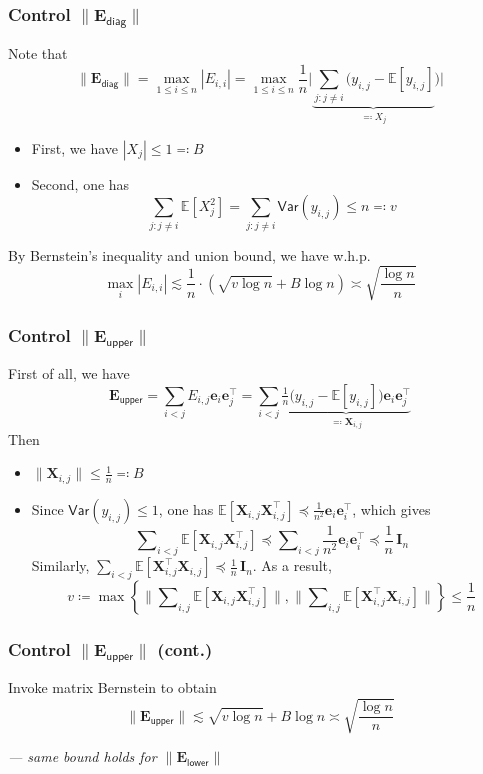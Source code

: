 \documentclass[compress,
mathserif,wide,%
]{beamer}
\begin{document}
\begin{frame}
	\frametitle{Control $\|\bm{E}_{\mathsf{diag}}\|$}
	Note that
	\[
\|\bm{E}_{\mathsf{diag}}\|=\max_{1\leq i\leq n}|E_{i,i}|=\max_{1\leq i\leq n} \frac{1}{n} \Big| \underbrace{\sum_{j:j\neq i}\big( y_{i,j}- \mathbb{E} [ y_{i,j}]}_{\eqqcolon X_{j}} \big) \Big|
\]
\begin{itemize}
	\item First, we have $|X_j| \leq 1 \eqqcolon B$
	\item Second, one has
	\[
	\sum_{j : j \neq i} \mathbb{E} [X_j^2] = \sum_{j : j \neq i} \mathsf{Var} (y_{i,j}) \leq n \eqqcolon v
	\]
\end{itemize}
By Bernstein's inequality and union bound, we have w.h.p.
\[
\max_{i} |E_{i,i}| \lesssim \frac{1}{n} \cdot ( \sqrt{v \log n} + B \log n) \asymp \sqrt{\frac{\log n }{n}}
\]
\end{frame}

\begin{frame}
	\frametitle{Control $\|\bm{E}_{\mathsf{upper}}\|$}
	First of all, we have
	\[
	\bm{E}_{\mathsf{upper}} = \sum_{i < j} E_{i,j} \bm{e}_{i} \bm{e}_{j}^{\top} =\sum_{i < j} \underbrace{ \tfrac{1}{n} \big( y_{i,j}- \mathbb{E} [ y_{i,j}] \big) \bm{e}_{i} \bm{e}_{j}^{\top} }_{\eqqcolon \bm{X}_{i,j}}
	\]
	Then 
	\begin{itemize}
		\item $\|\bm{X}_{i,j}\| \leq \frac{1}{n} \eqqcolon B$
		\item Since $\mathsf{Var}(y_{i,j})\leq 1$, one has
$\mathbb{E}\left[\bm{X}_{i,j}\bm{X}_{i,j}^{\top}\right]\preceq \frac{1}{n^2} \bm{e}_{i}\bm{e}_{i}^{\top}$, which gives
%
\[
\sum\nolimits_{i < j}\mathbb{E}\left[\bm{X}_{i,j}\bm{X}_{i,j}^{\top}\right]\preceq\sum\nolimits_{i<j} \frac{1}{n^2} \bm{e}_{i}\bm{e}_{i}^{\top} \preceq \frac{1}{n}\,\bm{I}_{n}
\]
%
Similarly, $\sum_{i<j}\mathbb{E}\left[ \bm{X}_{i,j}^{\top} \bm{X}_{i,j} \right]\preceq \frac{1}{n}\,\bm{I}_{n}$.
As a result,
%
\[
v \coloneqq \max\left\{ \Big\|\sum\nolimits_{i,j}\mathbb{E}\left[\bm{X}_{i,j}\bm{X}_{i,j}^{\top}\right]\Big\|,\Big\|\sum\nolimits_{i,j}\mathbb{E}\left[\bm{X}_{i,j}^{\top}\bm{X}_{i,j}\right]\Big\|\right\} \leq \frac{1}{n}
\]

	\end{itemize}
\end{frame}

\begin{frame}
	\frametitle{Control $\|\bm{E}_{\mathsf{upper}}\|$ (cont.)}
	Invoke matrix Bernstein to obtain
	\[
	\|\bm{E}_{\mathsf{upper}}\| \lesssim \sqrt{v \log n} + B \log n \asymp \sqrt{\frac{\log n}{n}}
	\] 
	
	\vfill
	{\hfill \em --- same bound holds for  $\|\bm{E}_{\mathsf{lower}}\|$}
\end{frame}
\end{document}
